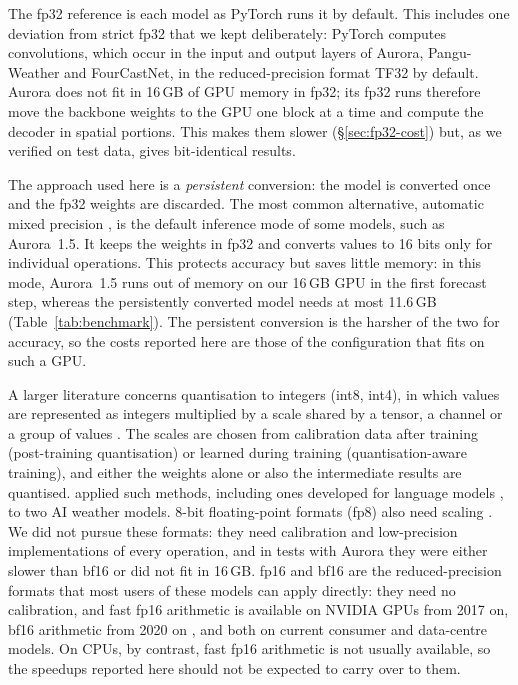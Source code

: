 The fp32 reference is each model as PyTorch runs it by default. This
includes one deviation from strict fp32 that we kept deliberately:
PyTorch computes convolutions, which occur in the input and output
layers of Aurora, Pangu-Weather and FourCastNet, in the reduced-precision
format TF32 by default. Aurora
does not fit in 16\,GB of GPU memory in fp32; its fp32 runs therefore
move the backbone weights to the GPU one block at a time and compute
the decoder in spatial portions. This makes them slower
(\S\ref{sec:fp32-cost}) but, as we verified on test data, gives
bit-identical results.

The approach used here is a \emph{persistent} conversion: the model is
converted once and the fp32 weights are discarded. The most common
alternative, automatic mixed precision \citep{micikevicius2018mixed}, is the
default inference mode of some models, such as Aurora~1.5. It keeps the
weights in fp32 and converts values to 16 bits only for individual operations.
This protects accuracy but saves little memory: in this mode, Aurora~1.5 runs
out of memory on our 16\,GB GPU in the first forecast step, whereas the
persistently converted model needs at most 11.6\,GB
(Table~\ref{tab:benchmark}). The persistent conversion is the harsher of the
two for accuracy, so the costs reported here are those of the configuration
that fits on such a GPU.

A larger literature concerns quantisation to integers (int8, int4),
in which values are represented as integers multiplied by a scale shared
by a tensor, a channel or a group of values
\citep{jacob2018quantization, nagel2021white}. The scales are chosen from calibration data
after training (post-training quantisation) or learned during training
(quantisation-aware training), and either the weights alone or also the
intermediate results are quantised. \citet{bhattacharya2026ptq} applied
such methods, including ones developed for language models
\citep{xiao2022smoothquant, lin2023awq}, to two AI weather models.
8-bit floating-point formats (fp8) also need scaling
\citep{micikevicius2022fp8}. We did not pursue these formats: they need
calibration and low-precision implementations of every operation, and in
tests with Aurora they were either slower than bf16 or did not fit in
16\,GB. fp16 and bf16 are the
reduced-precision formats that most users of these models can apply
directly: they need no calibration, and fast fp16 arithmetic is
available on NVIDIA GPUs from 2017 on, bf16 arithmetic from 2020 on
\citep{nvidia2017volta, nvidia2020ampere}, and both on current consumer and
data-centre models. On CPUs, by contrast, fast fp16 arithmetic is
not usually available, so the speedups reported here should not be
expected to carry over to them.


